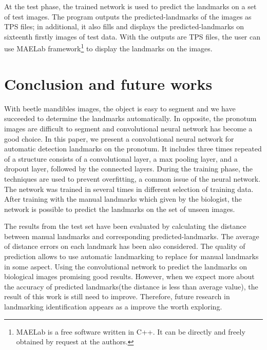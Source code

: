 \documentclass[conference]{IEEEtran}
\begin{document}
At the test phase, the trained network is used to predict the landmarks on a set of test images. The program outputs the predicted-landmarks of the images as TPS files; in additional, it also fills and displays the predicted-landmarks on sixteenth firstly images of test data. With the outputs are TPS files, the user can use MAELab\cite{le2017maelab} framework\footnote{MAELab is a free software written in C++. It can be directly
and freely obtained by request at the authors.} to display the landmarks on the images.
\section{Conclusion and future works}
With beetle mandibles images, the object is easy to segment and we have succeeded to determine the landmarks automatically. In opposite, the pronotum images are difficult to segment and convolutional neural network has become a good choice. In this paper, we present a convolutional neural network for automatic detection landmarks on the pronotum. It includes three times repeated of a structure consists of a convolutional layer, a max pooling layer, and a dropout layer, followed by the connected layers. During the training phase, the techniques are used to prevent overfitting, a common issue of the neural network. The network was trained in several times in different selection of training data. After training with the manual landmarks which given by the biologist, the network is possible to predict the landmarks on the set of unseen images.

The results from the test set have been evaluated by calculating the distance between manual landmarks and corresponding predicted-landmarks. The average of distance errors on each landmark has been also considered. The quality of prediction allows to use automatic landmarking to replace for manual landmarks in some aspect. Using the convolutional network to predict the landmarks on biological images promising good results. However, when we expect more about the accuracy of predicted landmarks(the distance is less than average value), the result of this work is still need to improve. Therefore, future research in landmarking identification appears as a improve the worth exploring.


\end{document}

